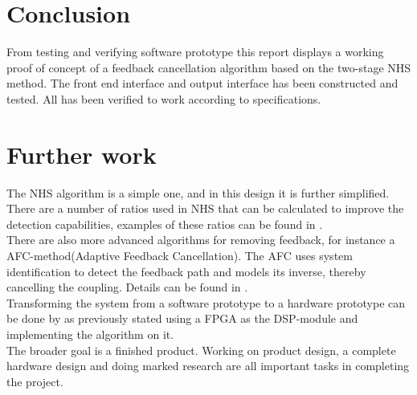\section{Conclusion}
From testing and verifying software prototype this report displays a working proof of concept of a feedback cancellation  algorithm based on the two-stage NHS method. The front end interface and output interface has been constructed and tested. All has been verified to work according to specifications.

\section{Further work}
The NHS algorithm is a simple one, and in this design it is further simplified. There are a number of ratios used in NHS that can be calculated to improve the detection capabilities, examples of these ratios can be found in \cite{van_waterschoot_fifty_2011}. \\

There are also more advanced algorithms for removing feedback, for instance a AFC-method(Adaptive Feedback Cancellation). The AFC uses system identification to detect the feedback path and models its inverse, thereby cancelling the coupling. Details can be found in \cite{van_waterschoot_fifty_2011}.\\

Transforming the system from a software prototype to a hardware prototype can be done by as previously stated using a FPGA as the DSP-module and implementing the algorithm on it.\\
The broader goal is a finished product. Working on product design, a complete hardware design and doing marked research are all important tasks in completing the project.